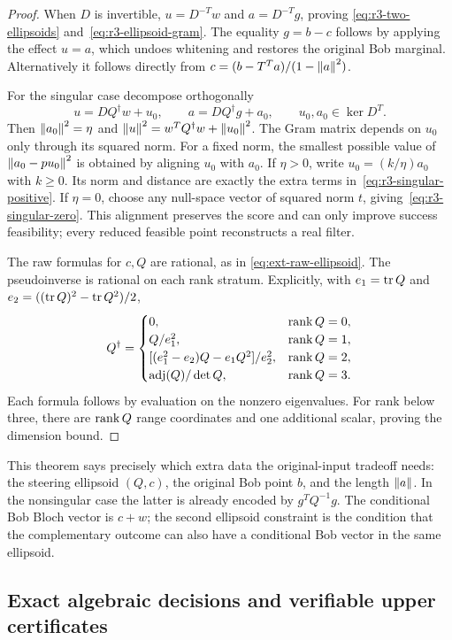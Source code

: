 \begin{proof}
When $D$ is invertible, $u=D^{-T}w$ and $a=D^{-T}g$, proving
\eqref{eq:r3-two-ellipsoids} and~\eqref{eq:r3-ellipsoid-gram}.
The equality $g=b-c$ follows by applying the effect $u=a$, which
undoes whitening and restores the original Bob marginal.
Alternatively it follows directly from
$c=(b-T^Ta)/(1-\left\lVert a\right\rVert^2)$.

For the singular case decompose orthogonally
\[
 u=DQ^\dagger w+u_0,\qquad
 a=DQ^\dagger g+a_0,\qquad
 u_0,a_0\in\ker D^T.
\]
Then $\left\lVert a_0\right\rVert^2=\eta$ and
$\left\lVert u\right\rVert^2=w^TQ^\dagger w+\left\lVert u_0\right\rVert^2$.
The Gram matrix depends on $u_0$ only through its squared norm.
For a fixed norm, the smallest possible value of
$\left\lVert a_0-pu_0\right\rVert^2$ is obtained by aligning $u_0$ with $a_0$.
If $\eta>0$, write $u_0=(k/\eta)a_0$ with $k\ge0$.
Its norm and distance are exactly the extra terms
in~\eqref{eq:r3-singular-positive}.
If $\eta=0$, choose any null-space vector of squared norm $t$,
giving~\eqref{eq:r3-singular-zero}.
This alignment preserves the score and can only improve success
feasibility; every reduced feasible point reconstructs a real filter.

The raw formulas for $c,Q$ are rational, as in
\eqref{eq:ext-raw-ellipsoid}. The pseudoinverse is rational on each
rank stratum. Explicitly, with $e_1=\operatorname{tr} Q$ and
$e_2=((\operatorname{tr} Q)^2-\operatorname{tr} Q^2)/2$,
\[
 Q^\dagger=
 \begin{cases}
 0,&\operatorname{rank} Q=0,\\
 Q/e_1^2,&\operatorname{rank} Q=1,\\
 [(e_1^2-e_2)Q-e_1Q^2]/e_2^2,&\operatorname{rank} Q=2,\\
 \operatorname{adj}(Q)/\det Q,&\operatorname{rank} Q=3.
 \end{cases}
\]
Each formula follows by evaluation on the nonzero eigenvalues.
For rank below three, there are $\operatorname{rank} Q$ range coordinates and one
additional scalar, proving the dimension bound.
\end{proof}

This theorem says precisely which extra data the original-input
tradeoff needs: the steering ellipsoid $(Q,c)$, the original Bob point
$b$, and the length $\left\lVert a\right\rVert$. In the nonsingular case the latter is
already encoded by $g^TQ^{-1}g$.
The conditional Bob Bloch vector is $c+w$; the second ellipsoid
constraint is the condition that the complementary outcome can also
have a conditional Bob vector in the same ellipsoid.

\subsection{Exact algebraic decisions and verifiable upper certificates}

